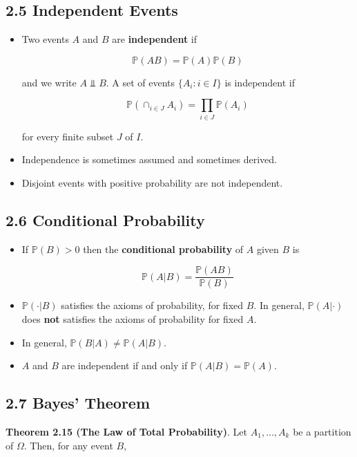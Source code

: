 \subsection{2.5 Independent Events}\label{independent-events}

\begin{itemize}
\item
  Two events \(A\) and \(B\) are \textbf{independent} if

  \[ \mathbb{P}(AB) = \mathbb{P}(A) \mathbb{P}(B) \]

  and we write \(A \text{ ⫫ } B\). A set of events
  \(\{ A_i : i \in I \}\) is independent if

  \[ \mathbb{P} \left( \cap_{i \in J} A_i \right) = \prod_{i \in J} \mathbb{P}(A_i) \]

  for every finite subset \(J\) of \(I\).
\item
  Independence is sometimes assumed and sometimes derived.
\item
  Disjoint events with positive probability are not independent.
\end{itemize}

\subsection{2.6 Conditional
Probability}\label{conditional-probability}

\begin{itemize}
\item
  If \(\mathbb{P}(B) > 0\) then the \textbf{conditional probability} of
  \(A\) given \(B\) is

  \[ \mathbb{P}(A | B) = \frac{\mathbb{P}(AB)}{\mathbb{P}(B)} \]
\item
  \(\mathbb{P}(\cdot | B)\) satisfies the axioms of probability, for
  fixed \(B\). In general, \(\mathbb{P}(A | \cdot)\) does \textbf{not}
  satisfies the axioms of probability for fixed \(A\).
\item
  In general, \(\mathbb{P}(B | A) \neq \mathbb{P}(A | B)\).
\item
  \(A\) and \(B\) are independent if and only if
  \(\mathbb{P}(A | B) = \mathbb{P}(A)\).
\end{itemize}

\subsection{2.7 Bayes' Theorem}\label{bayes-theorem}

\textbf{Theorem 2.15 (The Law of Total Probability)}. Let
\(A_1, \dots, A_k\) be a partition of \(\Omega\). Then, for any event
\(B\),

